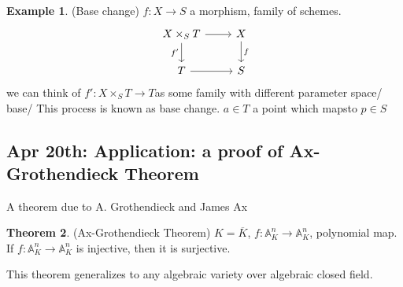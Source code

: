 \documentclass[11pt]{article}
\theoremstyle{definition}
\newtheorem{thm}{Theorem}[section]
\newtheorem{ex}[thm]{Example}
\newcommand{\affn}{\mathbb A}
\newcommand{\lrta}{\longrightarrow}
\begin{document}
\begin{ex}
(Base change)
$f:X\lrta S$ a morphism, family of schemes.
$$
\begin{tikzcd}
X\times_S T \arrow[d, "f'"'] \arrow[r] & X \arrow[d, "f"] \\
T \arrow[r] & S
\end{tikzcd}
$$
 we can think of $f':X\times_{S}T\lrta T$as some family with different parameter space/ base/
 This process is known as base change. $a\in T$ a point which mapsto $p\in S$
\end{ex}
\subsection{Apr 20th: Application: a proof of Ax-Grothendieck Theorem}
A theorem due to A. Grothendieck and James Ax
\begin{thm}\label{thm:Ax-Grothendick}(Ax-Grothendieck Theorem)
$K=\overline{K}$, $f: \affn^n_K\lrta \affn^n_K$, polynomial map. If $f:\affn^n_K\lrta \affn^n_K$ is injective, then it is surjective.
\end{thm}
This theorem generalizes to any algebraic variety over algebraic closed field.
\end{document}
